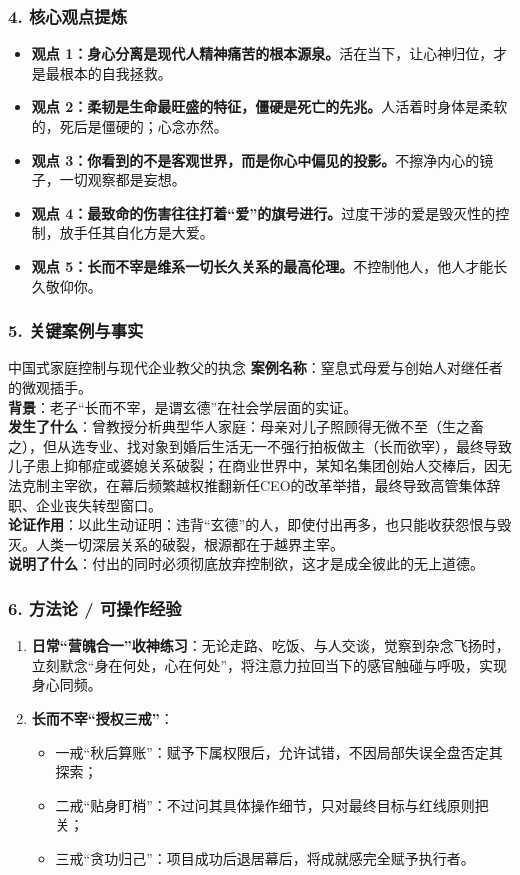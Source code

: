 \subsubsection{4. 核心观点提炼}
\begin{itemize}
    \item \textbf{观点 1：身心分离是现代人精神痛苦的根本源泉。}活在当下，让心神归位，才是最根本的自我拯救。
    \item \textbf{观点 2：柔韧是生命最旺盛的特征，僵硬是死亡的先兆。}人活着时身体是柔软的，死后是僵硬的；心念亦然。
    \item \textbf{观点 3：你看到的不是客观世界，而是你心中偏见的投影。}不擦净内心的镜子，一切观察都是妄想。
    \item \textbf{观点 4：最致命的伤害往往打着“爱”的旗号进行。}过度干涉的爱是毁灭性的控制，放手任其自化方是大爱。
    \item \textbf{观点 5：长而不宰是维系一切长久关系的最高伦理。}不控制他人，他人才能长久敬仰你。
\end{itemize}

\subsubsection{5. 关键案例与事实}
\begin{CaseBox}{中国式家庭控制与现代企业教父的执念}
\textbf{案例名称}：窒息式母爱与创始人对继任者的微观插手。\\
\textbf{背景}：老子“长而不宰，是谓玄德”在社会学层面的实证。\\
\textbf{发生了什么}：曾教授分析典型华人家庭：母亲对儿子照顾得无微不至（生之畜之），但从选专业、找对象到婚后生活无一不强行拍板做主（长而欲宰），最终导致儿子患上抑郁症或婆媳关系破裂；在商业世界中，某知名集团创始人交棒后，因无法克制主宰欲，在幕后频繁越权推翻新任CEO的改革举措，最终导致高管集体辞职、企业丧失转型窗口。\\
\textbf{论证作用}：以此生动证明：违背“玄德”的人，即使付出再多，也只能收获怨恨与毁灭。人类一切深层关系的破裂，根源都在于越界主宰。\\
\textbf{说明了什么}：付出的同时必须彻底放弃控制欲，这才是成全彼此的无上道德。
\end{CaseBox}

\subsubsection{6. 方法论 / 可操作经验}
\begin{enumerate}
    \item \textbf{日常“营魄合一”收神练习}：无论走路、吃饭、与人交谈，觉察到杂念飞扬时，立刻默念“身在何处，心在何处”，将注意力拉回当下的感官触碰与呼吸，实现身心同频。
    \item \textbf{长而不宰“授权三戒”}：
    \begin{itemize}
        \item 一戒“秋后算账”：赋予下属权限后，允许试错，不因局部失误全盘否定其探索；
        \item 二戒“贴身盯梢”：不过问其具体操作细节，只对最终目标与红线原则把关；
        \item 三戒“贪功归己”：项目成功后退居幕后，将成就感完全赋予执行者。
    \end{itemize}
\end{enumerate}

